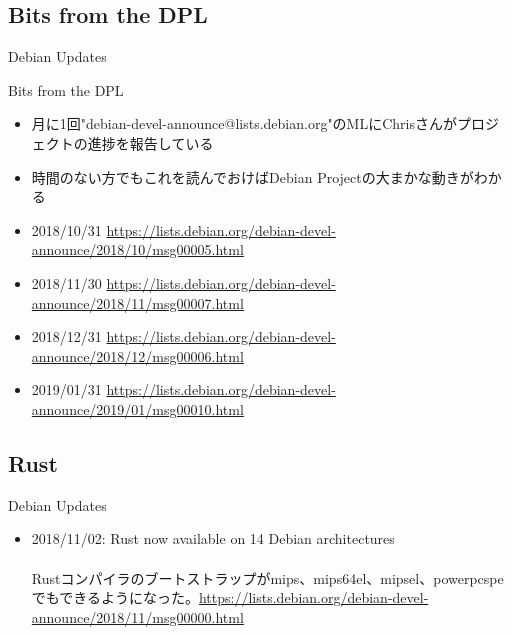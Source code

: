 \subsection{Bits from the DPL}

\begin{frame}{Debian Updates}%

Bits from the DPL

\begin{itemize}
\item 月に1回"debian-devel-announce@lists.debian.org"のMLにChrisさんがプロジェクトの進捗を報告している
\item 時間のない方でもこれを読んでおけばDebian Projectの大まかな動きがわかる
\end{itemize}

\small{
\begin{itemize}

\item 2018/10/31 \url{https://lists.debian.org/debian-devel-announce/2018/10/msg00005.html}
\item 2018/11/30 \url{https://lists.debian.org/debian-devel-announce/2018/11/msg00007.html}
\item 2018/12/31 \url{https://lists.debian.org/debian-devel-announce/2018/12/msg00006.html}
\item 2019/01/31 \url{https://lists.debian.org/debian-devel-announce/2019/01/msg00010.html}

\end{itemize}
}

\end{frame}


\subsection{Rust}

\begin{frame}{Debian Updates}%

\begin{itemize}
\item 2018/11/02: Rust now available on 14 Debian architectures \\
\ \\
  \small{Rustコンパイラのブートストラップがmips、mips64el、mipsel、powerpcspeでもできるようになった。\url{https://lists.debian.org/debian-devel-announce/2018/11/msg00000.html}}

\end{itemize}

\end{frame}


